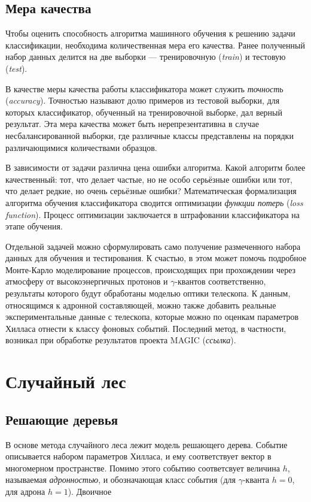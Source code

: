 \documentclass[magd,floatypics,numeref]{msudipl} %
\begin{document}
\subsection{Мера качества}
Чтобы оценить способность алгоритма машинного обучения к решению задачи классификации, необходима количественная мера его качества. Ранее полученный набор данных делится на две выборки --- тренировочную (\textit{train}) и тестовую (\textit{test}). 

В качестве меры качества работы классификатора может служить \textit{точность} (\textit{accuracy}). Точностью называют долю примеров из тестовой выборки, для которых классификатор, обученный на тренировочной выборке, дал верный результат.  Эта мера качества может быть нерепрезентативна в случае несбалансированной выборки, где различные классы представлены на порядки различающимися количествами образцов. 

В зависимости от задачи различна цена ошибки алгоритма. Какой алгоритм более качественный: тот, что делает частые, но не особо серьёзные ошибки или тот, что делает редкие, но очень серьёзные ошибки? Математическая формализация алгоритма обучения классификатора сводится оптимизации \textit{функции потерь} (\textit{loss function}). Процесс оптимизации заключается в штрафовании классификатора на этапе обучения.

Отдельной задачей можно сформулировать само получение размеченного набора данных для обучения и тестирования. К счастью, в этом может помочь подробное Монте-Карло моделирование процессов, происходящих при прохождении через атмосферу от высокоэнергичных протонов и $\gamma$-квантов соответственно, результаты которого будут обработаны моделью оптики телескопа. К данным, относящимся к адронной составляющей, можно также добавить реальные экспериментальные данные с телескопа, которые можно по оценкам параметров Хилласа отнести к классу фоновых событий. Последний метод, в частности, возникал при обработке результатов проекта MAGIC (\textit{ссылка}).

\section{Случайный лес}
\subsection{Решающие деревья}
В основе метода случайного леса лежит модель решающего дерева. Событие описывается набором параметров Хилласа, и ему соответствует вектор в многомерном пространстве. Помимо этого событию соответсвует величина $h$, называемая \textit{адронностью}, и обозначающая класс события (для $\gamma$-кванта $h=0$, для адрона $h = 1$). Двоичное 
\end{document}
